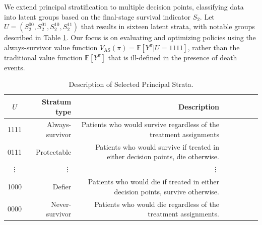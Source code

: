 \documentclass{article}
\newcommand{\E}{\mathbb{E}}
\newcommand{\tbl}[1]{\caption{#1}}
\begin{document}
We extend principal stratification to multiple decision points, classifying data into latent groups based on the final-stage survival indicator $S_2$. Let $U = (S_2^{00}, S_2^{01}, S_2^{10}, S_2^{11})$ %
that results in sixteen latent strata, with notable groups described in Table \ref{table:strata}. Our focus is on evaluating and optimizing policies using the always-survivor value function
	$
	V_{\text{AS}}(\pi) = \E\left[ Y^\pi | U = 1111 \right]
	$,
	rather than the traditional value function $\E[ Y^\pi ]$ that is ill-defined in the presence of death events.
	
\begin{table}
	\tbl{Description of Selected Principal Strata.}
{\footnotesize	\begin{tabular}{crrrcrrr}
	$U$  & Stratum type    & Description \\ 
	\hline
	1111 & Always-survivor & Patients who would survive regardless of the treatment assignments \\
	0111 & Protectable     & Patients who would survive if treated in either decision points, die otherwise. \\
	\vdots & \vdots & \vdots \\
	1000 & Defier          & Patients who would die if treated in either decision points, survive otherwise. \\
	0000 & Never-survivor  & Patients who would die regardless of the treatment assignments.   
	\end{tabular} }
	\label{table:strata}
\end{table}
\end{document}
